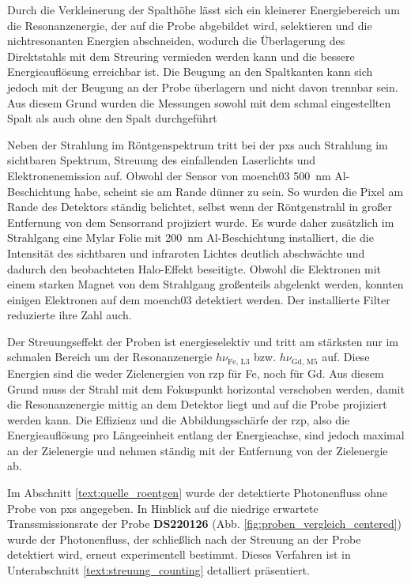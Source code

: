 \noindent
Durch die Verkleinerung der Spalthöhe lässt sich ein kleinerer Energiebereich um die Resonanzenergie, der auf die Probe abgebildet wird, selektieren und die nichtresonanten Energien abschneiden, wodurch die Überlagerung des Direktstahls mit dem Streuring vermieden werden kann und die bessere Energieauflösung erreichbar ist. Die Beugung an den Spaltkanten kann sich jedoch mit der Beugung an der Probe überlagern und nicht davon trennbar sein. Aus diesem Grund wurden die Messungen sowohl mit dem schmal eingestellten Spalt als auch ohne den Spalt durchgeführt

\noindent
Neben der Strahlung im Röntgenspektrum tritt bei der \gls{pxs} auch Strahlung im sichtbaren Spektrum, Streuung des einfallenden Laserlichts und Elektronenemission auf. Obwohl der Sensor von \gls{moench03} \SI{500}{\nano\meter} Al-Beschichtung habe, scheint sie am Rande dünner zu sein. So wurden die Pixel am Rande des Detektors ständig belichtet, selbst wenn der Röntgenstrahl in großer Entfernung von dem Sensorrand projiziert wurde. Es wurde daher zusätzlich im Strahlgang eine Mylar Folie mit \SI{200}{\nano\meter} Al-Beschichtung installiert, die die Intensität des sichtbaren und infraroten Lichtes deutlich abschwächte und dadurch den beobachteten Halo-Effekt beseitigte. Obwohl die Elektronen mit einem starken Magnet von dem Strahlgang großenteils abgelenkt werden, konnten einigen Elektronen auf dem \gls{moench03} detektiert werden. Der installierte Filter reduzierte ihre Zahl auch.
%

\noindent
Der Streuungseffekt der Proben ist energieselektiv und tritt am stärksten nur im schmalen Bereich um der Resonanzenergie $h\nu_{\text{Fe, L3}}$ bzw. $h\nu_{\text{Gd, M5}}$ auf. Diese Energien sind die weder Zielenergien von \gls{rzp} für Fe, noch für Gd. Aus diesem Grund muss der Strahl mit dem Fokuspunkt horizontal verschoben werden, damit die Resonanzenergie mittig an dem Detektor liegt und auf die Probe projiziert werden kann. Die Effizienz und die Abbildungsschärfe der \gls{rzp}, also die Energieauflösung pro Längeeinheit entlang der Energieachse, sind jedoch maximal an der Zielenergie und nehmen ständig mit der Entfernung von der Zielenergie ab.

\noindent
Im Abschnitt \ref{text:quelle_roentgen} wurde der detektierte Photonenfluss ohne Probe von \gls{pxs} angegeben. In Hinblick auf die niedrige erwartete Transsmissionsrate der Probe \textbf{DS220126} (Abb. \ref{fig:proben_vergleich_centered}) wurde der Photonenfluss, der schließlich nach der Streuung an der Probe detektiert wird, erneut experimentell bestimmt. Dieses Verfahren ist in Unterabschnitt \ref{text:streuung_counting} detalliert präsentiert.

